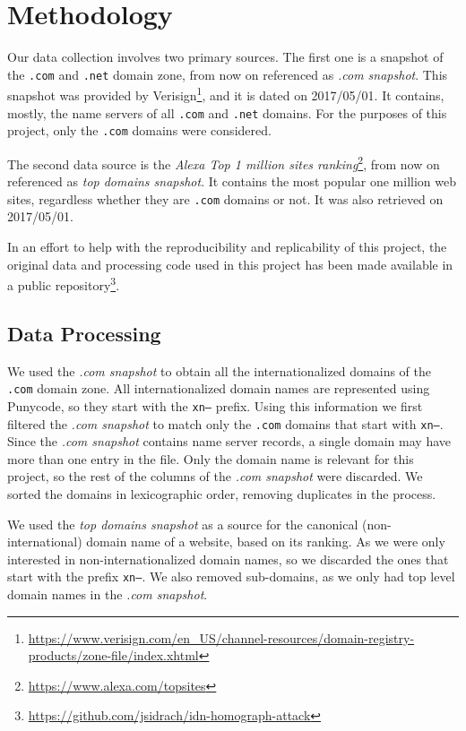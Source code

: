 \documentclass[letterpaper,twocolumn,10pt]{article}
\begin{document}
\section{Methodology}
Our data collection involves two primary sources.
The first one is a snapshot of the \texttt{.com} and \texttt{.net} domain zone, from now on referenced as \textit{.com snapshot}.
This snapshot was provided by Verisign\footnote{\url{https://www.verisign.com/en_US/channel-resources/domain-registry-products/zone-file/index.xhtml}}, and it is dated on 2017/05/01.
It contains, mostly, the name servers of all \texttt{.com} and \texttt{.net} domains.
For the purposes of this project, only the \texttt{.com} domains were considered.

The second data source is the \textit{Alexa Top 1 million sites ranking}\footnote{\url{https://www.alexa.com/topsites}}, from now on referenced as \textit{top domains snapshot}.
It contains the most popular one million web sites, regardless whether they are \texttt{.com} domains or not.
It was also retrieved on 2017/05/01.

In an effort to help with the reproducibility and replicability of this project, the original data and processing code used in this project has been made available in a public repository\footnote{\url{https://github.com/jsidrach/idn-homograph-attack}}.

\subsection{Data Processing}
We used the \textit{.com snapshot} to obtain all the internationalized domains of the \texttt{.com} domain zone.
All internationalized domain names are represented using Punycode, so they start with the \texttt{xn--} prefix.
Using this information we first filtered the \textit{.com snapshot} to match only the \texttt{.com} domains that start with \texttt{xn--}.
Since the \textit{.com snapshot} contains name server records, a single domain may have more than one entry in the file.
Only the domain name is relevant for this project, so the rest of the columns of the \textit{.com snapshot} were discarded.
We sorted the domains in lexicographic order, removing duplicates in the process.

We used the \textit{top domains snapshot} as a source for the canonical (non-international) domain name of a website, based on its ranking.
As we were only interested in non-internationalized domain names, so we discarded the ones that start with the prefix \texttt{xn--}.
We also removed sub-domains, as we only had top level domain names in the \textit{.com snapshot}.
\end{document}

